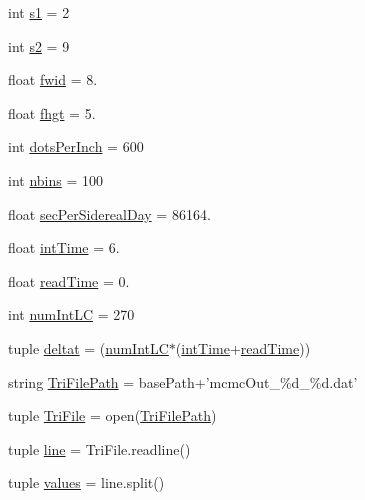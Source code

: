 \begin{DoxyCompactItemize}
\item 
int \hyperlink{namespace_final_analysis_a8237fbcf96157871ca15161b8c911d6a}{s1} = 2
\item 
int \hyperlink{namespace_final_analysis_a6e5fab082186d13ccafedfe0f8a36fd3}{s2} = 9
\item 
float \hyperlink{namespace_final_analysis_abc30d10b634674cdb4958c494025d3ce}{fwid} = 8.
\item 
float \hyperlink{namespace_final_analysis_a655a72c0122ba74cfe825ce4a0fd48e0}{fhgt} = 5.
\item 
int \hyperlink{namespace_final_analysis_ae1013699910a86a41a0a50eeba068419}{dots\-Per\-Inch} = 600
\item 
int \hyperlink{namespace_final_analysis_ab8aad06278d0423ea7c2ef145097954b}{nbins} = 100
\item 
float \hyperlink{namespace_final_analysis_aad4e1075c61393b18c1fe9942acd8789}{sec\-Per\-Sidereal\-Day} = 86164.
\item 
float \hyperlink{namespace_final_analysis_ae7544fab9b92313efce519dfcbe443ef}{int\-Time} = 6.
\item 
float \hyperlink{namespace_final_analysis_a52de26ab1dba066ec7d2b10dd3bd8544}{read\-Time} = 0.
\item 
int \hyperlink{namespace_final_analysis_a9481028e551e6a7d0abf48c81f22cf86}{num\-Int\-L\-C} = 270
\item 
tuple \hyperlink{namespace_final_analysis_aa27dc5884cf09a2ac3f1fb3489bb359b}{deltat} = (\hyperlink{namespace_final_analysis_a9481028e551e6a7d0abf48c81f22cf86}{num\-Int\-L\-C}$\ast$(\hyperlink{namespace_final_analysis_ae7544fab9b92313efce519dfcbe443ef}{int\-Time}+\hyperlink{namespace_final_analysis_a52de26ab1dba066ec7d2b10dd3bd8544}{read\-Time}))
\item 
string \hyperlink{namespace_final_analysis_abf963966146e1751a9c7aeb6a4df238a}{Tri\-File\-Path} = base\-Path+'mcmc\-Out\-\_\-\%d\-\_\-\%d.\-dat'
\item 
tuple \hyperlink{namespace_final_analysis_a05fafd47a96b32e6c3dc6e30dac35672}{Tri\-File} = open(\hyperlink{namespace_final_analysis_abf963966146e1751a9c7aeb6a4df238a}{Tri\-File\-Path})
\item 
tuple \hyperlink{namespace_final_analysis_a7c83462f12c6791e4425510419b04eb4}{line} = Tri\-File.\-readline()
\item 
tuple \hyperlink{namespace_final_analysis_acd9913ccc0f466893ae0a193d0a17388}{values} = line.\-split()

\end{DoxyCompactItemize}

